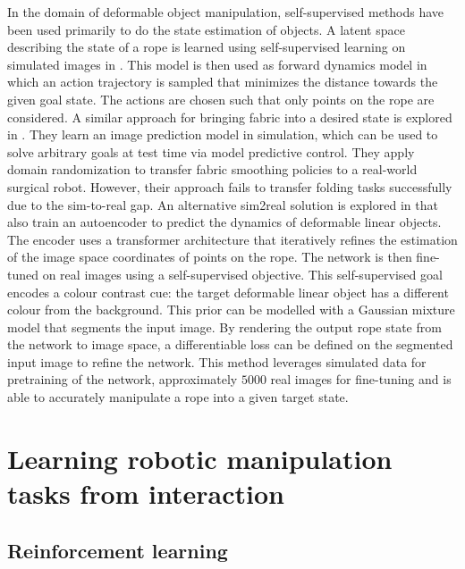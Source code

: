 \documentclass[\home/main.tex]{subfiles}
\begin{document}
In the domain of deformable object manipulation, self-supervised methods have been used primarily to do the state estimation of objects. A latent space describing the state of a rope is learned using self-supervised learning on simulated images in \autocite{yan2020learning}. This model is then used as forward dynamics model in which an action trajectory is sampled that minimizes the distance towards the given goal state. The actions are chosen such that only points on the rope are considered. A similar approach for bringing fabric into a desired state is explored in \autocite{fabric_vsf_2020}. They learn an image prediction model in simulation, which can be used to solve arbitrary goals at test time via model predictive control. They apply domain randomization to transfer fabric smoothing policies to a real-world surgical robot. However, their approach fails to transfer folding tasks successfully due to the sim-to-real gap. An alternative sim2real solution is explored in \autocite{Mengyuan2020} that also train an autoencoder to predict the dynamics of deformable linear objects. The encoder uses a transformer architecture \autocite{vaswani2017attention} that iteratively refines the estimation of the image space coordinates of points on the rope. The network is then fine-tuned on real images using a self-supervised objective. This self-supervised goal encodes a colour contrast cue: the target deformable linear object has a different colour from the background. This prior can be modelled with a Gaussian mixture model that segments the input image. By rendering the output rope state from the network to image space, a differentiable loss can be defined on the segmented input image to refine the network. This method leverages simulated data for pretraining of the network, approximately $5000$ real images for fine-tuning and is able to accurately manipulate a rope into a given target state.

\section{Learning robotic manipulation tasks from interaction} \label{subsec:lit_rl}
\subsection{Reinforcement learning}
\end{document}
